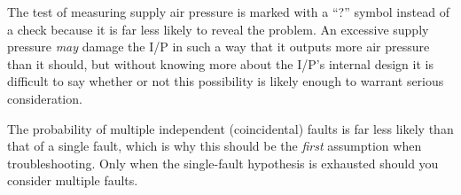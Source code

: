 The test of measuring supply air pressure is marked with a ``?'' symbol instead of a check because it is far less likely to reveal the problem.  An excessive supply pressure {\it may} damage the I/P in such a way that it outputs more air pressure than it should, but without knowing more about the I/P's internal design it is difficult to say whether or not this possibility is likely enough to warrant serious consideration.

\vskip 10pt

The probability of multiple independent (coincidental) faults is far less likely than that of a single fault, which is why this should be the {\it first} assumption when troubleshooting.  Only when the single-fault hypothesis is exhausted should you consider multiple faults.




